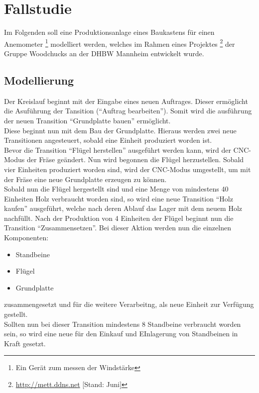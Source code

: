 \chapter{Fallstudie}
\label{chap:fallstudie}
Im Folgenden soll eine Produktionsanlage eines Baukastens für einen
Anemometer \footnote{Ein Gerät zum messen der Windstärke} modelliert werden, welches im Rahmen eines Projektes \footnote{\url{http://mett.ddns.net} [Stand: Juni]}  der Gruppe Woodchucks an der DHBW Mannheim entwickelt wurde.
\section{Modellierung}
Der Kreislauf beginnt mit der Eingabe eines neuen Auftrages. Dieser ermöglicht die Asuführung der Tansition ("`Auftrag bearbeiten"').
Somit wird die ausführung der neuen Transition "`Grundplatte bauen"' ermöglicht. \\ Diese beginnt nun mit dem Bau der Grundplatte. Hieraus werden zwei neue Transitionen angesteuert, sobald eine Einheit produziert worden ist. \\ Bevor die Transition "`Flügel herstellen"' ausgeführt werden kann, wird der CNC-Modus der Fräse geändert.  Nun wird begonnen die Flügel herzustellen. Sobald vier Einheiten produziert worden sind, wird der CNC-Modus umgestellt, um mit der Fräse eine neue Grundplatte erzeugen zu können. \\ Sobald nun die Flügel hergestellt sind und eine Menge von mindestens 40 Einheiten Holz verbraucht worden sind, so wird eine neue Transition "`Holz kaufen"' ausgeführt, welche nach deren Ablauf das Lager mit dem neuem Holz nachfüllt. Nach der Produktion von 4 Einheiten der Flügel beginnt nun die Transition "`Zusammensetzen"'. Bei dieser Aktion werden nun die einzelnen Komponenten: \begin{itemize}
	\itemsep0pt
	\item Standbeine
	\item Flügel
	\item Grundplatte
\end{itemize} zusammengesetzt und für die weitere Verarbeitng, als neue Einheit zur Verfügung gestellt. \\ Sollten nun bei dieser Transition mindestens 8 Standbeine verbraucht worden sein, so wird eine neue für den Einkauf und EInlagerung von Standbeinen in Kraft gesetzt.
